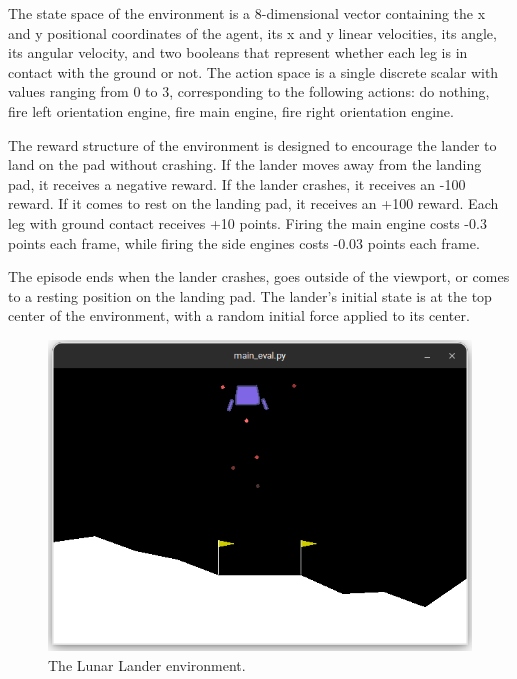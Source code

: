 The state space of the environment is a 8-dimensional vector containing the x and y positional coordinates of the agent, its x and y linear velocities, its angle, its angular velocity, and two booleans that represent whether each leg is in contact with the ground or not. The action space is a single discrete scalar with values ranging from 0 to 3, corresponding to the following actions: do nothing, fire left orientation engine, fire main engine, fire right orientation engine.

The reward structure of the environment is designed to encourage the lander to land on the pad without crashing. If the lander moves away from the landing pad, it receives a negative reward. If the lander crashes, it receives an -100 reward. If it comes to rest on the landing pad, it receives an +100 reward. Each leg with ground contact receives +10 points. Firing the main engine costs -0.3 points each frame, while firing the side engines costs -0.03 points each frame.

The episode ends when the lander crashes, goes outside of the viewport, or comes to a resting position on the landing pad. The lander's initial state is at the top center of the environment, with a random initial force applied to its center.

\begin{figure}[htbp]
    \centerline{\includegraphics[width=\columnwidth]{./img/lunar-lander-env.png}}
    \caption{The Lunar Lander environment.}
    \label{fig:lunar-lander-env}
\end{figure}


